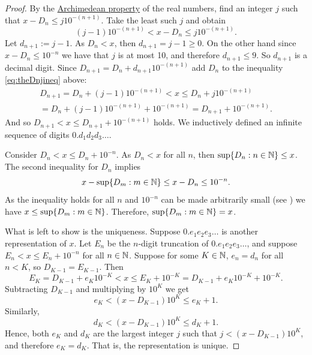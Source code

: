 \begin{proof}
By the 
\hyperref[thm:arch:i]{Archimedean property} of the real numbers,
find an integer $j$ such that
$x-D_n \leq j {10}^{-(n+1)}$.  Take the least such $j$ and obtain 
\begin{equation} \label{eq:theDnjineq}
(j-1){10}^{-(n+1)} < x-D_n \leq j {10}^{-(n+1)} .
\end{equation}
Let $d_{n+1} := j-1$.
As $D_n < x$,
then $d_{n+1} = j-1 \geq 0$.  On the other hand since
$x-D_n \leq {10}^{-n}$ we have that
$j$ is at most 10, and therefore $d_{n+1} \leq 9$.
So $d_{n+1}$ is a
decimal digit.
Since $D_{n+1} = D_n + d_{n+1} {10}^{-(n+1)}$
add $D_n$ to the inequality
\eqref{eq:theDnjineq} above:
\begin{multline*}
D_{n+1} = D_n + (j-1){10}^{-(n+1)} < x
\leq
D_n + j {10}^{-(n+1)} \\
=
D_n + (j-1) {10}^{-(n+1)} +
{10}^{-(n+1)} = D_{n+1} + {10}^{-(n+1)} .
\end{multline*}
And so
$D_{n+1} < x \leq D_{n+1} + {10}^{-(n+1)}$ holds.
We inductively
defined an infinite sequence of digits $0.d_1d_2d_3\ldots$.

Consider $D_{n} < x \leq D_{n} + {10}^{-n}$.
As $D_n < x$ for all $n$, then
$\sup \{ D_n : n \in {\mathbb{N}} \} \leq x$.
The second inequality for $D_n$ implies
\begin{equation*}
x - \sup \{ D_m : m \in {\mathbb{N}} \}
\leq
x - D_n \leq 10^{-n} .
\end{equation*}
As the inequality holds for all $n$ and
${10}^{-n}$ can be made arbitrarily small (see
) we have $x \leq 
\sup \{ D_m : m \in {\mathbb{N}} \}$.
Therefore,
$\sup \{ D_m : m \in {\mathbb{N}} \} = x$.

What is left to show is the uniqueness.
Suppose $0.e_1e_2e_3\ldots$ is another representation of $x$.
Let $E_n$ be the $n$-digit truncation of $0.e_1e_2e_3\ldots$, and suppose
$E_n < x \leq E_n + {10}^{-n}$ for all $n \in {\mathbb{N}}$.
Suppose for some $K \in {\mathbb{N}}$, $e_n = d_n$ for all $n < K$, so
$D_{K-1} = E_{K-1}$.  Then
\begin{equation*}
E_K = D_{K-1} + e_K{10}^{-K} < x \leq E_K + {10}^{-K} = D_{K-1} +
e_K{10}^{-K} + {10}^{-K} .
\end{equation*}
Subtracting $D_{K-1}$ and multiplying by ${10}^{K}$ we get
\begin{equation*}
e_K < (x - D_{K-1}){10}^K \leq e_K + 1 .
\end{equation*}
Similarly,
\begin{equation*}
d_K < (x - D_{K-1}){10}^K \leq d_K + 1 .
\end{equation*}
Hence, both $e_K$ and $d_K$ are the largest integer $j$
such that $j < (x - D_{K-1}){10}^K$, and therefore $e_K = d_K$.  That is,
the representation is unique.
\end{proof}


